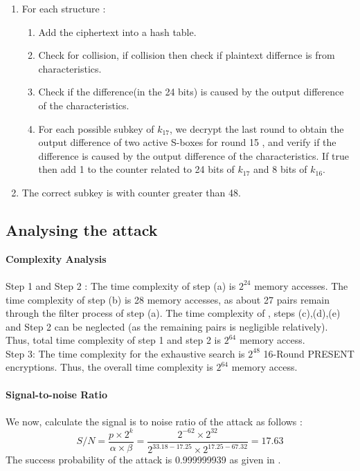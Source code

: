 \documentclass[preprint]{transcrypto}
\begin{document}
\begin{enumerate}
    \item For each structure : 
    \begin{enumerate}[label=\alph*)]
        \item Add the ciphertext into a hash table.
        \item Check for collision, if collision then check if plaintext differnce is from characteristics.
        \item Check if the difference(in the 24 bits) is caused by the output difference of the characteristics.
        \item For each possible subkey of $k_{17}$, we decrypt the last round to obtain the output difference of two active S-boxes for round 15 , and verify if the difference is caused by the output difference of the characteristics. If true then add 1 to the counter related to 24 bits of $k_17$ and 8 bits of $k_16$. 
    \end{enumerate}
    \item The correct subkey is with counter greater than 48.

\end{enumerate}
\subsection{Analysing the attack}
\textbf{Complexity Analysis} \\ \\
Step 1  and Step 2 : The time complexity of step (a) is $2^{24}$ memory accesses. The time complexity of step (b) is 28 memory accesses, as about 27 pairs remain through the filter process of step (a). The time complexity of , steps (c),(d),(e) and Step 2 can be neglected (as the remaining pairs is negligible relatively). Thus, total time complexity of step 1 and step 2 is $2^{64}$ memory access. \\ 
Step 3: The time complexity for the exhaustive search is $2^{48}$ 16-Round PRESENT encryptions. Thus, the overall time complexity is $2^{64}$ memory access.\\ \\
\textbf{Signal-to-noise Ratio} \\ \\
We now, calculate the signal is to noise ratio of the attack as follows : 
\begin{equation*}
    S/N = \frac{p \times 2^k}{\alpha \times \beta} = \frac{2^{-62} \times 2^{32}}{2^{33.18-17.25} \times 2^{17.25-67.32}} = 17.63
\end{equation*}
The success probability of the attack is 0.999999939 as given in \cite{2}. 
\end{document}
